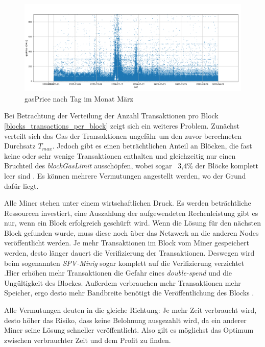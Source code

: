 \documentclass[runningheads]{llncs}
\begin{document}
\begin{figure}[h!]
  \centerline{\includegraphics[width=\textwidth, keepaspectratio]{transactions_gasprice_timeseries.png}}
  \caption{gasPrice nach Tag im Monat März \cite{neemann_appendix_nodate}}
  \label{transactions_gasprice_timeseries}
\end{figure}

Bei Betrachtung der Verteilung der Anzahl Transaktionen pro Block \ref{blocks_transactions_per_block} zeigt sich ein weiteres Problem. Zunächst verteilt sich das Gas der Transaktionen ungefähr um den zuvor berechneten Durchsatz $ T_{max} $. Jedoch gibt es einen beträchtlichen Anteil an Blöcken, die fast keine oder sehr wenige Transaktionen enthalten und gleichzeitig nur einen Bruchteil des \textit{blockGasLimit} ausschöpfen, wobei sogar ~3,4\% der Blöcke komplett leer sind \cite{neemann_appendix_nodate}. Es können mehrere Vermutungen angestellt werden, wo der Grund dafür liegt.

Alle Miner stehen unter einem wirtschaftlichen Druck. Es werden beträchtliche Ressourcen investiert, eine Auszahlung der aufgewendeten Rechenleistung gibt es nur, wenn ein Block erfolgreich geschürft wird. Wenn die Lösung für den nächsten Block gefunden wurde, muss diese noch über das Netzwerk an die anderen Nodes veröffentlicht werden. Je mehr Transaktionen im Block vom Miner gespeichert werden, desto länger dauert die Verifizierung der Transaktionen. Deswegen wird beim sogenannten \textit{SPV-Minig} sogar komplett auf die Verifizierung verzichtet \cite{svanevik_why_2018}.Hier erhöhen mehr Transaktionen die Gefahr eines \textit{double-spend} und die Ungültigkeit des Blockes. Außerdem verbrauchen mehr Transaktionen mehr Speicher, ergo desto mehr Bandbreite benötigt die Veröffentlichung des Blocks \cite{research_empty_nodate}. 

Alle Vermutungen deuten in die gleiche Richtung: Je mehr Zeit verbraucht wird, desto höher das Risiko, dass keine Belohnung ausgezahlt wird, da ein anderer Miner seine Lösung schneller veröffentlicht. Also gilt es möglichst das Optimum zwischen verbrauchter Zeit und dem Profit zu finden.
\end{document}

